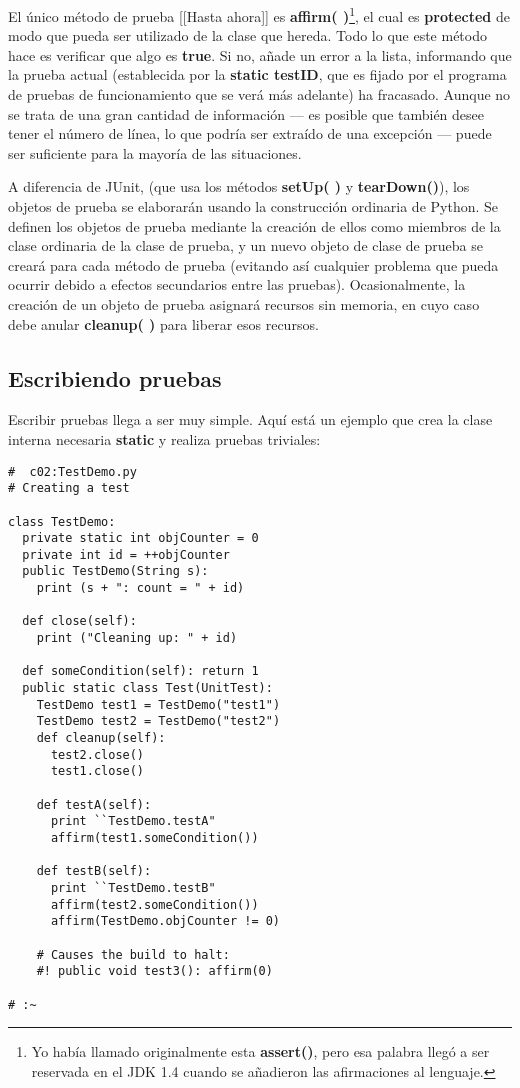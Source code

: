 El único método de prueba [[Hasta ahora]] es \textbf{affirm( )}\footnote{Yo había llamado originalmente esta \textbf{assert()}, pero esa palabra llegó a ser reservada en el JDK 1.4 cuando se añadieron las afirmaciones al lenguaje.}, el cual es \textbf{protected} de modo que pueda ser utilizado de la clase que hereda. Todo lo que este método hace es verificar que algo es \textbf{true}. Si no, añade un error a la lista, informando que la prueba actual (establecida por la \textbf{static testID}, que es fijado por el programa de pruebas de funcionamiento que se verá más adelante) ha fracasado. Aunque no se trata de una gran cantidad de información — es posible que también desee tener el número de línea, lo que podría ser extraído de una excepción — puede ser suficiente para la mayoría de las situaciones.    \newline

A diferencia de JUnit, (que usa los métodos \textbf{setUp( )} y \textbf{tearDown()}), los objetos de prueba se elaborarán usando la construcción ordinaria de Python. Se definen los objetos de prueba mediante la creación de ellos como miembros de la clase ordinaria de la clase de prueba, y un nuevo objeto de clase de prueba se creará para cada método de prueba (evitando así cualquier problema que pueda ocurrir debido a efectos secundarios entre las pruebas). Ocasionalmente, la creación de un objeto de prueba asignará recursos sin memoria, en cuyo caso debe anular \textbf{cleanup( )} para liberar esos recursos.     \newline

\subsection*{Escribiendo pruebas}  
\label{subsec:ep}

Escribir pruebas llega a ser muy simple. Aquí está un ejemplo que crea la clase interna necesaria \textbf{static} y realiza pruebas triviales: \newline

\begin{lstlisting}
#  c02:TestDemo.py 
# Creating a test 

class TestDemo: 
  private static int objCounter = 0 
  private int id = ++objCounter 
  public TestDemo(String s): 
    print (s + ": count = " + id)
    
  def close(self): 
    print ("Cleaning up: " + id) 
    
  def someCondition(self): return 1  
  public static class Test(UnitTest): 
    TestDemo test1 = TestDemo("test1") 
    TestDemo test2 = TestDemo("test2") 
    def cleanup(self):  
      test2.close() 
      test1.close() 
      
    def testA(self):  
      print ``TestDemo.testA"
      affirm(test1.someCondition()) 
      
    def testB(self):  
      print ``TestDemo.testB"
      affirm(test2.someCondition()) 
      affirm(TestDemo.objCounter != 0) 
      
    # Causes the build to halt: 
    #! public void test3(): affirm(0)  
    
# :~ 
\end{lstlisting}

